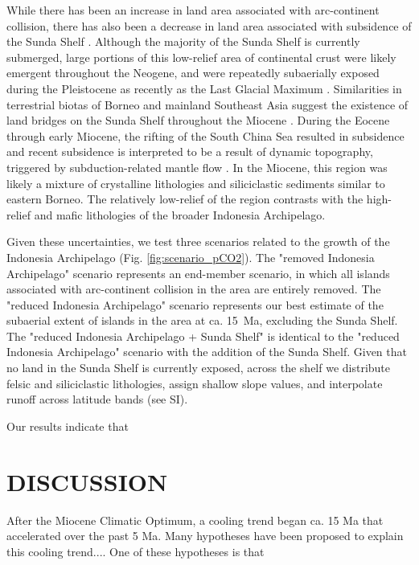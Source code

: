 \documentclass[11pt,letterpaper]{article}
\begin{document}
While there has been an increase in land area associated with arc-continent collision, there has also been a decrease in land area associated with subsidence of the Sunda Shelf \citep{Sarr2019a}. Although the majority of the Sunda Shelf is currently submerged, large portions of this low-relief area of continental crust were likely emergent throughout the Neogene, and were repeatedly subaerially exposed during the Pleistocene as recently as the Last Glacial Maximum \citep{Halls2002a}. Similarities in terrestrial biotas of Borneo and mainland Southeast Asia suggest the existence of land bridges on the Sunda Shelf throughout the Miocene \citep{Moss1998a}. During the Eocene through early Miocene, the rifting of the South China Sea resulted in subsidence \citep{Morley2013a} and recent subsidence is interpreted to be a result of dynamic topography, triggered by subduction-related mantle flow \citep{Sarr2019a}. In the Miocene, this region was likely a mixture of crystalline lithologies and siliciclastic sediments similar to eastern Borneo. The relatively low-relief of the region contrasts with the high-relief and mafic lithologies of the broader Indonesia Archipelago.

Given these uncertainties, we test three scenarios related to the growth of the Indonesia Archipelago (Fig. \ref{fig:scenario_pCO2}). The "removed Indonesia Archipelago" scenario represents an end-member scenario, in which all islands associated with arc-continent collision in the area are entirely removed. The "reduced Indonesia Archipelago" scenario represents our best estimate of the subaerial extent of islands in the area at ca. 15~Ma, excluding the Sunda Shelf. The "reduced Indonesia Archipelago + Sunda Shelf" is identical to the "reduced Indonesia Archipelago" scenario with the addition of the Sunda Shelf. Given that no land in the Sunda Shelf is currently exposed, across the shelf we distribute felsic and siliciclastic lithologies, assign shallow slope values, and interpolate runoff across latitude bands (see SI).

Our results indicate that 

\section*{DISCUSSION}

After the Miocene Climatic Optimum, a cooling trend began ca. 15 Ma that accelerated over the past 5 Ma. Many hypotheses have been proposed to explain this cooling trend.... One of these hypotheses is that
\end{document}
